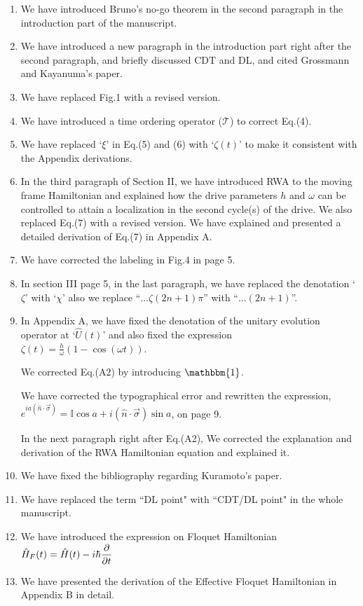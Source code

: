 \documentclass[aps,prb,reprint,showpacs,floatfix,superscriptaddress, onecolumn, 9pt]{revtex4-2}
\begin{document}
\begin{enumerate}
    \item We have introduced Bruno's no-go theorem in the second paragraph in the introduction part of the manuscript.
    \item We have introduced a new paragraph in the introduction part right after the second paragraph, and briefly discussed CDT and DL, and cited Grossmann and Kayanuma’s paper. 
    \item We have replaced Fig.1 with a revised version.
    \item We have introduced a time ordering operator ($\mathcal{T}$) to correct Eq.(4).
    \item We have replaced `$\xi$' in Eq.(5) and (6) with `$\zeta(t)$' to make it consistent with the Appendix derivations.
    \item In the third paragraph of Section II, we have introduced RWA to the moving frame Hamiltonian and explained how the drive parameters $h$ and $\omega$ can be controlled to attain a localization in the second cycle(s) of the drive. We also replaced Eq.(7) with a revised version. We have explained and presented a detailed derivation of Eq.(7) in Appendix A.
    \item We have corrected the labeling in Fig.4 in page 5.
    \item In section III page 5, in the last paragraph, we have replaced the denotation `$\zeta$' with `$\chi$' also we replace ``$\dots\zeta(2n+1)\pi$'' with ``$\dots (2n+1)$''.
    \item In Appendix A, we have fixed the denotation of the unitary evolution operator at `$\hat{U}(t)$' and also fixed the expression $\zeta(t) = \frac{h}{\omega}(1-\cos(\omega t))$. 

    We corrected Eq.(A2) by introducing $\mathbbm{1}$.

    We have corrected the typographical error and rewritten the expression, 
    $e^{i a\left(\hat{n} \cdot \vec{\sigma}\right)} = \mathbb{I}\cos{a} + i (\hat{n} \cdot \vec{\sigma}) \sin{a}$, on page 9.

    In the next paragraph right after Eq.(A2), We corrected the explanation and derivation of the RWA Hamiltonian equation and explained it.
    
    \item We have fixed the bibliography regarding Kuramoto's paper.
    \item We have replaced the term ``DL point" with ``CDT/DL point" in the whole manuscript.
    
    \item We have introduced the expression on Floquet Hamiltonian $\displaystyle \hat{H}_F(t) = \hat{H}(t) - i\hbar \pdv{t}$
    \item We have presented the derivation of the Effective Floquet Hamiltonian in Appendix B in detail.
\end{enumerate}


\end{document}

